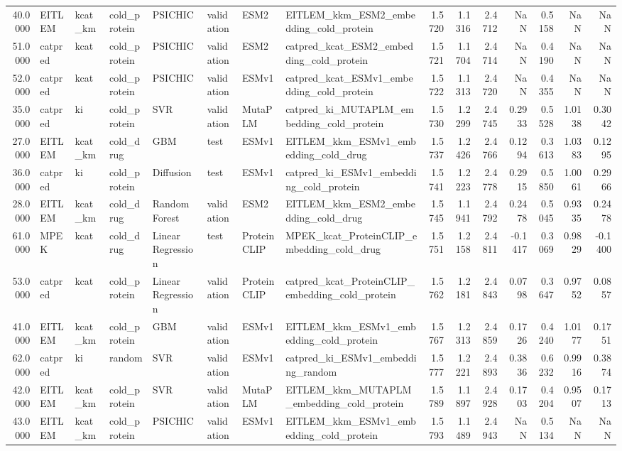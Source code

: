 \begin{tabular}{rlllllllrrrrrrr}
40.0000 & EITLEM & kcat_km & cold_protein & PSICHIC & validation & ESM2 & EITLEM_kkm_ESM2_embedding_cold_protein & 1.5720 & 1.1316 & 2.4712 & NaN & 0.5158 & NaN & NaN \\
51.0000 & catpred & kcat & cold_protein & PSICHIC & validation & ESM2 & catpred_kcat_ESM2_embedding_cold_protein & 1.5721 & 1.1704 & 2.4714 & NaN & 0.4190 & NaN & NaN \\
52.0000 & catpred & kcat & cold_protein & PSICHIC & validation & ESMv1 & catpred_kcat_ESMv1_embedding_cold_protein & 1.5722 & 1.1313 & 2.4720 & NaN & 0.4355 & NaN & NaN \\
35.0000 & catpred & ki & cold_protein & SVR & validation & MutaPLM & catpred_ki_MUTAPLM_embedding_cold_protein & 1.5730 & 1.2299 & 2.4745 & 0.2933 & 0.5528 & 1.0138 & 0.3042 \\
27.0000 & EITLEM & kcat_km & cold_drug & GBM & test & ESMv1 & EITLEM_kkm_ESMv1_embedding_cold_drug & 1.5737 & 1.2426 & 2.4766 & 0.1294 & 0.3613 & 1.0383 & 0.1295 \\
36.0000 & catpred & ki & cold_protein & Diffusion & test & ESMv1 & catpred_ki_ESMv1_embedding_cold_protein & 1.5741 & 1.2223 & 2.4778 & 0.2915 & 0.5850 & 1.0061 & 0.2966 \\
28.0000 & EITLEM & kcat_km & cold_drug & Random Forest & validation & ESM2 & EITLEM_kkm_ESM2_embedding_cold_drug & 1.5745 & 1.1941 & 2.4792 & 0.2478 & 0.5045 & 0.9335 & 0.2478 \\
61.0000 & MPEK & kcat & cold_drug & Linear Regression & test & ProteinCLIP & MPEK_kcat_ProteinCLIP_embedding_cold_drug & 1.5751 & 1.2158 & 2.4811 & -0.1417 & 0.3069 & 0.9829 & -0.1400 \\
53.0000 & catpred & kcat & cold_protein & Linear Regression & validation & ProteinCLIP & catpred_kcat_ProteinCLIP_embedding_cold_protein & 1.5762 & 1.2181 & 2.4843 & 0.0798 & 0.3647 & 0.9752 & 0.0857 \\
41.0000 & EITLEM & kcat_km & cold_protein & GBM & validation & ESMv1 & EITLEM_kkm_ESMv1_embedding_cold_protein & 1.5767 & 1.2313 & 2.4859 & 0.1726 & 0.4240 & 1.0177 & 0.1751 \\
62.0000 & catpred & ki & random & SVR & validation & ESMv1 & catpred_ki_ESMv1_embedding_random & 1.5777 & 1.2221 & 2.4893 & 0.3836 & 0.6232 & 0.9916 & 0.3874 \\
42.0000 & EITLEM & kcat_km & cold_protein & SVR & validation & MutaPLM & EITLEM_kkm_MUTAPLM_embedding_cold_protein & 1.5789 & 1.1897 & 2.4928 & 0.1703 & 0.4204 & 0.9507 & 0.1713 \\
43.0000 & EITLEM & kcat_km & cold_protein & PSICHIC & validation & ESMv1 & EITLEM_kkm_ESMv1_embedding_cold_protein & 1.5793 & 1.1489 & 2.4943 & NaN & 0.5134 & NaN & NaN \\

\end{tabular}
